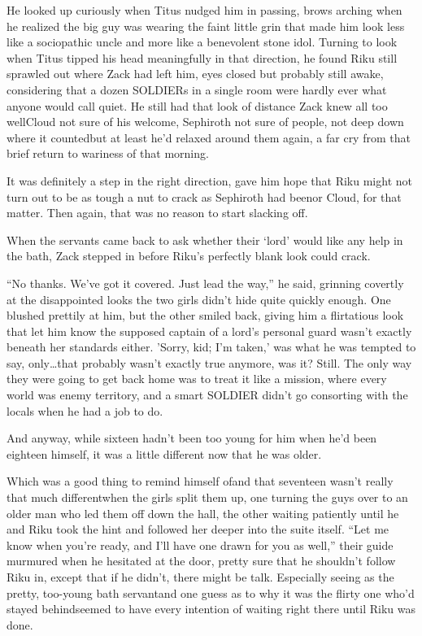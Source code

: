 He looked up curiously when Titus nudged him in passing, brows arching when he realized the big guy was wearing the faint little grin that made him look less like a sociopathic uncle and more like a benevolent stone idol. Turning to look when Titus tipped his head meaningfully in that direction, he found Riku still sprawled out where Zack had left him, eyes closed but probably still awake, considering that a dozen SOLDIERs in a single room were hardly ever what anyone would call quiet. He still had that look of distance Zack knew all too well\textemdash Cloud not sure of his welcome, Sephiroth not sure of people, not deep down where it counted\textemdash but at least he'd relaxed around them again, a far cry from that brief return to wariness of that morning.

It was definitely a step in the right direction, gave him hope that Riku might not turn out to be as tough a nut to crack as Sephiroth had been\textemdash or Cloud, for that matter. Then again, that was no reason to start slacking off.

When the servants came back to ask whether their `lord' would like any help in the bath, Zack stepped in before Riku's perfectly blank look could crack.

``No thanks. We've got it covered. Just lead the way,'' he said, grinning covertly at the disappointed looks the two girls didn't hide quite quickly enough. One blushed prettily at him, but the other smiled back, giving him a flirtatious look that let him know the supposed captain of a lord's personal guard wasn't exactly beneath her standards either. 'Sorry, kid; I'm taken,' was what he was tempted to say, only\ldots that probably wasn't exactly true anymore, was it? Still. The only way they were going to get back home was to treat it like a mission, where every world was enemy territory, and a smart SOLDIER didn't go consorting with the locals when he had a job to do.

And anyway, while sixteen hadn't been too young for him when he'd been eighteen himself, it was a little different now that he was older.

Which was a good thing to remind himself of\textemdash and that seventeen wasn't really that much different\textemdash when the girls split them up, one turning the guys over to an older man who led them off down the hall, the other waiting patiently until he and Riku took the hint and followed her deeper into the suite itself. ``Let me know when you're ready, and I'll have one drawn for you as well,'' their guide murmured when he hesitated at the door, pretty sure that he shouldn't follow Riku in, except that if he didn't, there might be talk. Especially seeing as the pretty, too-young bath servant\textemdash and one guess as to why it was the flirty one who'd stayed behind\textemdash seemed to have every intention of waiting right there until Riku was done.

